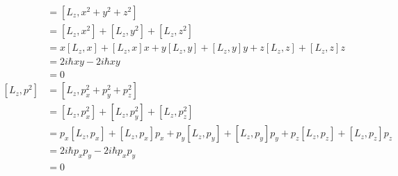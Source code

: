 \documentclass{article}
\begin{document}
\begin{enumerate}
        \begin{align*}
          [L_z, r^2] & = [L_z, x^2 + y^2 + z^2]                                                                              \\
                     & = [L_z, x^2] + [L_z, y^2] + [L_z, z^2]                                                                \\
                     & = x [L_z, x] + [L_z, x] x + y [L_z, y] + [L_z, y] y + z [L_z, z] + [L_z, z] z                         \\
                     & = 2 i \hbar x y - 2 i \hbar x y                                                                       \\
                     & = 0                                                                                                   \\
          [L_z, p^2] & = [L_z, p_x^2 + p_y^2 + p_z^2]                                                                        \\
                     & = [L_z, p_x^2] + [L_z, p_y^2] + [L_z, p_z^2]                                                          \\
                     & = p_x [L_z, p_x] + [L_z, p_x] p_x + p_y [L_z, p_y] + [L_z, p_y] p_y + p_z [L_z, p_z] + [L_z, p_z] p_z \\
                     & = 2 i \hbar p_x p_y - 2 i \hbar p_x p_y                                                               \\
                     & = 0
        \end{align*}
\end{enumerate}

\setcounter{subsection}{23}
\subsection{}
\end{document}
